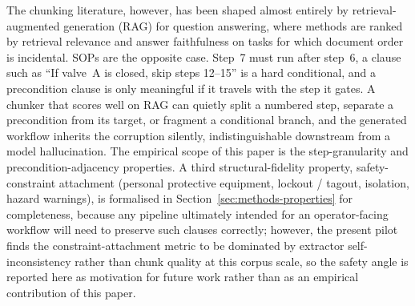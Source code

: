 \documentclass[make,article,submit,oneauthor,pdftex]{Definitions/mdpi}
\begin{document}
The chunking literature, however, has been shaped almost entirely by
retrieval-augmented generation
(RAG)\cite{lewis2020rag,karpukhin2020dpr} for question answering, where
methods are ranked by retrieval relevance and answer faithfulness on
tasks for which document order is incidental. SOPs are the opposite
case. Step~7 must run after step~6, a clause such as ``If valve~A is
closed, skip steps 12--15'' is a hard conditional, and a precondition
clause is only meaningful if it travels with the step it gates. A
chunker that scores well on RAG can quietly split a numbered step,
separate a precondition from its target, or fragment a conditional
branch, and the generated workflow inherits the corruption silently,
indistinguishable downstream from a model
hallucination\cite{ji2023hallucination}. The empirical scope of this
paper is the step-granularity and precondition-adjacency properties.
A third structural-fidelity property, safety-constraint attachment
(personal protective equipment, lockout / tagout, isolation, hazard
warnings), is formalised in Section~\ref{sec:methods-properties} for
completeness, because any pipeline ultimately intended for an
operator-facing workflow will need to preserve such clauses correctly;
however, the present pilot finds the constraint-attachment metric to
be dominated by extractor self-inconsistency rather than chunk quality
at this corpus scale, so the safety angle is reported here as
motivation for future work rather than as an empirical contribution
of this paper.
\end{document}
